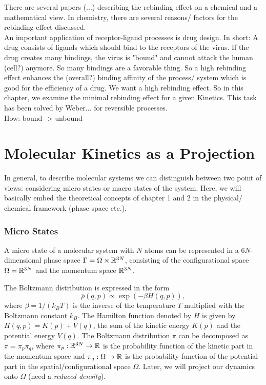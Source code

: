 There are several papers (...) describing the rebinding effect on a chemical and a mathematical view. In chemistry, there are several reasons/ factors for the rebinding effect discussed.
\\

An important application of receptor-ligand processes is drug design. In short: A drug consists of ligands which should bind to the receptors of the virus. If the drug creates many bindings, the virus is "bound" and cannot attack the human (cell?) anymore. So many bindings are a favorable thing. So a high rebinding effect enhances the (overall?) binding affinity of the process/ system which is good for the efficiency of a drug. We want a high rebinding effect.
So in this chapter, we examine the minimal rebinding effect for a given Kinetics.
This task has been solved by Weber... for reversible processes.
\\

How: bound -> unbound


\section{Molecular Kinetics as a Projection}

In general, to describe molecular systems we can distinguish between two point of views: considering micro states or macro states of the system.
Here, we will basically embed the theoretical concepts of chapter 1 and 2 in the physical/ chemical framework (phase space etc.).

\subsubsection*{Micro States}
A micro state of a molecular system with $N$ atoms can be represented in a $6N$-dimensional phase space $\Gamma = \Omega \times {\mathbb{R}^{3N}}$, consisting of the configurational space $\Omega = {\mathbb{R}^{3N}}$ and the momentum space ${\mathbb{R}^{3N}}$.

The Boltzmann distribution is expressed in the form
\begin{equation}
\bar{\rho}(q,p) \propto \exp{(-\beta H(q,p))},
\end{equation}
where $\beta = 1/ (k_BT)$ is the inverse of the temperature $T$ multiplied with the Boltzmann constant $k_B$. The Hamilton function denoted by $H$ is given by $H(q,p) = K(p)+V(q)$, the sum of the kinetic energy $K(p)$ and the potential energy $V(q)$.
The Boltzmann distribution $\pi$ can be decomposed as $\pi = \pi_p \pi_q$, where  $\pi_p: \mathbb{R}^{3N}  \rightarrow \mathbb{R}$ is the probability function of the kinetic part in the momentum space and $\pi_q: \Omega \rightarrow \mathbb{R}$ is the probability function of the potential part in the spatial/configurational space $\Omega$.
Later, we will project our dynamics onto $\Omega$ (need a \textit{reduced density}).

